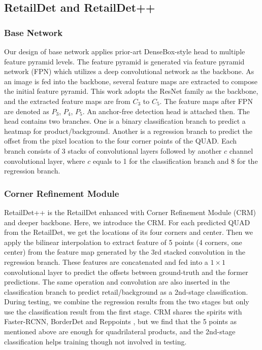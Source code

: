 \documentclass[runningheads]{llncs}
\begin{document}
\subsection{RetailDet and RetailDet++}
\subsubsection{Base Network}
Our design of base network applies prior-art DenseBox-style head \cite{densebox} to multiple feature pyramid levels. The feature pyramid is generated via feature pyramid network (FPN) \cite{lin2016feature} which utilizes a deep convolutional network as the backbone. As an image is fed into the backbone, several feature maps are extracted to compose the initial feature pyramid. This work adopts the ResNet family as the backbone, and the extracted feature maps are from $C_3$ to $C_5$. The feature maps after FPN are denoted as $P_3$, $P_4$, $P_5$. An anchor-free detection head is attached then. The head contains two branches. One is a binary classification branch to predict a heatmap for product/background. Another is a regression branch to predict the offset from the pixel location to the four corner points of the QUAD. Each branch consists of 3 stacks of convolutional layers followed by another $c$ channel convolutional layer, where $c$ equals to 1 for the classification branch and 8 for the regression branch.

\subsubsection{Corner Refinement Module}
RetailDet++ is the RetailDet enhanced with Corner Refinement Module (CRM) and deeper backbone. Here, we introduce the CRM. For each predicted QUAD from the RetailDet, we get the locations of its four corners and center. Then we apply the bilinear interpolation to extract feature of 5 points (4 corners, one center) from the feature map generated by the 3rd stacked convolution in the regression branch. These features are concatenated and fed into a $1\times1$ convolutional layer to predict the offsets between ground-truth and the former predictions. The same operation and convolution are also inserted in the classification branch to predict retail/background as a 2nd-stage classification. During testing, we combine the regression results from the two stages but only use the classification result from the first stage. CRM shares the spirits with Faster-RCNN\cite{ren2015faster}, BorderDet\cite{BorderDet} and Reppoints \cite{reppoints}, but we find that the 5 points as mentioned above are enough for quadrilateral products, and the 2nd-stage classification helps training though not involved in testing.
\end{document}
